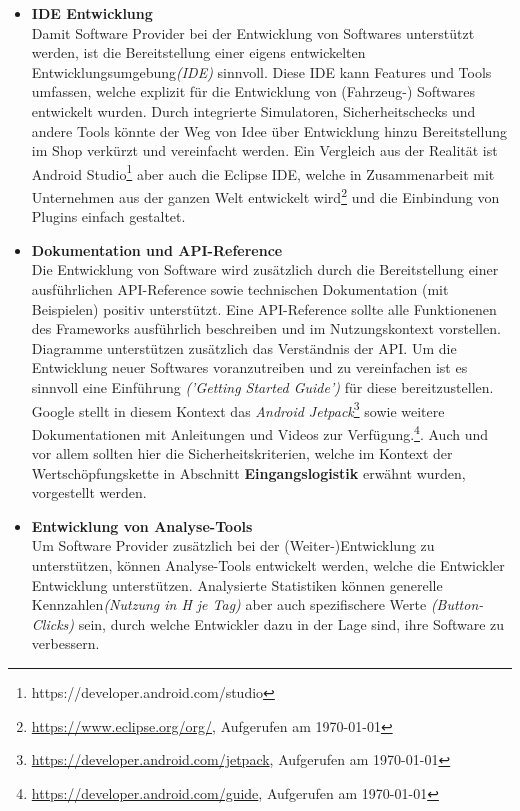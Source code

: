 \begin{itemize}
	\item[] \hspace{-0.6cm} \textbf{IDE Entwicklung}\\
	Damit Software Provider bei der Entwicklung von Softwares unterstützt werden, ist die Bereitstellung einer eigens entwickelten Entwicklungsumgebung\textit{(IDE)} sinnvoll. 
	Diese IDE kann Features und Tools umfassen, welche explizit für die Entwicklung von (Fahrzeug-) Softwares entwickelt wurden. Durch integrierte Simulatoren, Sicherheitschecks und andere Tools könnte der Weg von Idee über Entwicklung hinzu Bereitstellung im Shop verkürzt und vereinfacht werden. Ein Vergleich aus der Realität ist Android Studio\footnote{https://developer.android.com/studio} aber auch die Eclipse IDE, welche in Zusammenarbeit mit Unternehmen aus der ganzen Welt entwickelt wird\footnote{\url{https://www.eclipse.org/org/}, Aufgerufen am \today} und die Einbindung von Plugins einfach gestaltet.
	
	\item[] \hspace{-0.6cm} \textbf{Dokumentation und API-Reference}\\
	Die Entwicklung von Software wird zusätzlich durch die Bereitstellung einer ausführlichen API-Reference sowie technischen Dokumentation (mit Beispielen) positiv unterstützt. Eine API-Reference sollte alle Funktionenen des Frameworks ausführlich beschreiben und im Nutzungskontext vorstellen. Diagramme unterstützen zusätzlich das Verständnis der API. Um die Entwicklung neuer Softwares voranzutreiben und zu vereinfachen ist es sinnvoll eine Einführung \textit{('Getting Started Guide')} für diese bereitzustellen. Google stellt in diesem Kontext das \textit{Android Jetpack}\footnote{\url{https://developer.android.com/jetpack}, Aufgerufen am \today} sowie weitere Dokumentationen mit Anleitungen und Videos zur Verfügung.\footnote{\url{https://developer.android.com/guide}, Aufgerufen am \today}. Auch und vor allem sollten hier die Sicherheitskriterien, welche im Kontext der Wertschöpfungskette in Abschnitt \textbf{Eingangslogistik} erwähnt wurden, vorgestellt werden. 
	
	\item[] \hspace{-0.6cm} \textbf{Entwicklung von Analyse-Tools}\\
	Um Software Provider zusätzlich bei der (Weiter-)Entwicklung zu unterstützen, können Analyse-Tools entwickelt werden, welche die Entwickler Entwicklung unterstützen. Analysierte Statistiken können generelle Kennzahlen\textit{(Nutzung in H je Tag)} aber auch spezifischere Werte \textit{(Button-Clicks)} sein, durch welche Entwickler dazu in der Lage sind, ihre Software zu verbessern.
	

\end{itemize}
